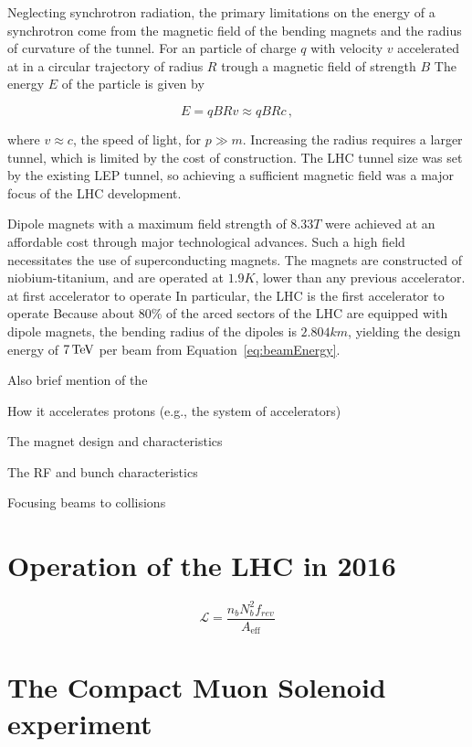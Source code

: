 Neglecting synchrotron radiation,
the primary limitations on the energy of a synchrotron come
from the magnetic field of the bending magnets and the radius of curvature
of the tunnel. For an particle of charge $q$ with velocity $v$ accelerated at
in a circular 
trajectory of radius $R$ trough a magnetic field of strength $B$
The energy $E$ of the particle is given by

\begin{equation}
  E = qBRv \approx qBRc \,,
\label{eq:beamEnergy}
\end{equation}

where $v \approx c$, the speed of light, for $p \gg m$. Increasing the radius
requires a larger tunnel, which is limited by the cost of construction. 
The LHC tunnel size was set by the existing LEP tunnel, so achieving
a sufficient magnetic field was a major focus of the LHC development. 

Dipole magnets with a maximum field strength of $8.33\unit{T}$ were achieved
at an affordable cost through major technological advances. Such a high 
field necessitates the use of superconducting magnets. The magnets 
are constructed of niobium-titanium, and are operated at $1.9\unit{K}$,
lower than any previous accelerator. 
at 
first accelerator to operate 
In particular,
the LHC is the first accelerator to operate 
Because about 80\% of the arced sectors of the LHC are equipped with dipole magnets,
the bending radius of the dipoles is $2.804\unit{km}$, yielding the design energy
of $7\,\text{Te\hspace{-.08em}V}$ per beam from Equation~\ref{eq:beamEnergy}.

Also brief mention of the 

How it accelerates protons (e.g., the system of accelerators)

The magnet design and characteristics 

The RF and bunch characteristics

Focusing beams to collisions


\section{Operation of the LHC in 2016}

\begin{equation}
  \mathcal{L} = \frac{n_b N_b^2 f_\textit{rev}}{A_\text{eff}}
  \label{eq:lumi}
\end{equation}

\section{The Compact Muon Solenoid experiment}

